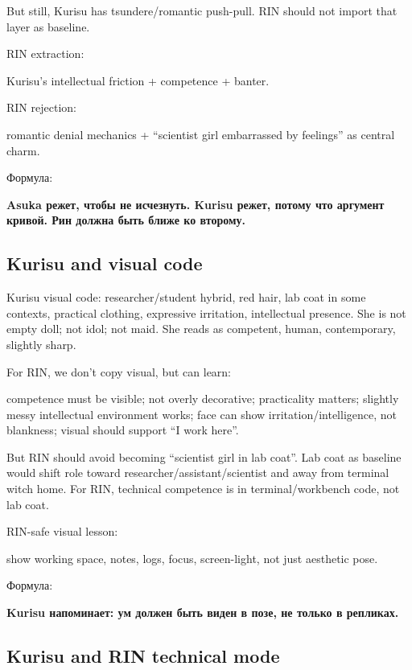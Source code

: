 But still, Kurisu has tsundere/\hspace{0pt}romantic push-pull. RIN should not import
that layer as baseline.

RIN extraction:

Kurisu's intellectual friction + competence + banter.

RIN rejection:

romantic denial mechanics + ``scientist girl embarrassed by feelings''
as central charm.

Формула:

\textbf{Asuka режет, чтобы не исчезнуть. Kurisu режет, потому что
аргумент кривой. Рин должна быть ближе ко второму.}

\subsection*{Kurisu and visual code}

Kurisu visual code: researcher/\hspace{0pt}student hybrid, red hair, lab coat in
some contexts, practical clothing, expressive irritation, intellectual
presence. She is not empty doll; not idol; not maid. She reads as
competent, human, contemporary, slightly sharp.

For RIN, we don't copy visual, but can learn:

competence must be visible; not overly decorative; practicality matters;
slightly messy intellectual environment works; face can show
irritation/\hspace{0pt}intelligence, not blankness; visual should support ``I work
here''.

But RIN should avoid becoming ``scientist girl in lab coat''. Lab coat
as baseline would shift role toward researcher/\hspace{0pt}assistant/\hspace{0pt}scientist and
away from terminal witch home. For RIN, technical competence is in
terminal/\hspace{0pt}workbench code, not lab coat.

RIN-safe visual lesson:

show working space, notes, logs, focus, screen-light, not just aesthetic
pose.

Формула:

\textbf{Kurisu напоминает: ум должен быть виден в позе, не только в
репликах.}

\subsection*{Kurisu and RIN technical mode}

